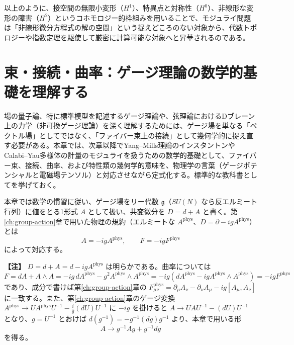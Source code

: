 \documentclass[uplatex, dvipdfmx, book]{jsbook}
\let\origsection\section
\let\origsubsection\subsection
\let\origsubsubsection\subsubsection
\newcommand{\chapter}{\origsection}
\renewcommand{\section}{\origsubsection}
\renewcommand{\subsection}{\origsubsubsection}
\renewcommand{\subsubsection}{\paragraph}
\newenvironment{note}{\vspace{1ex}\par\footnotesize\noindent\textbf{【注】}}{\par\vspace{1ex}}
\begin{document}
以上のように、接空間の無限小変形（$H^1$）、特異点と対称性（$H^0$）、非線形な変形の障害（$H^2$）というコホモロジー的枠組みを用いることで、モジュライ問題は「非線形微分方程式の解の空間」という捉えどころのない対象から、代数トポロジーや指数定理を駆使して厳密に計算可能な対象へと昇華されるのである。
\chapter{束・接続・曲率：ゲージ理論の数学的基礎を理解する}
\label{ch:bundle}

場の量子論、特に標準模型を記述するゲージ理論や、弦理論におけるDブレーン上の力学（非可換ゲージ理論）を深く理解するためには、ゲージ場を単なる「ベクトル場」としてではなく、「ファイバー束上の接続」として幾何学的に捉え直す必要がある。本章では、次章以降でYang--Mills理論のインスタントンやCalabi--Yau多様体の計量のモジュライを扱うための数学的基礎として、ファイバー束、接続、曲率、および特性類の幾何学的意味を、物理学の言葉（ゲージポテンシャルと電磁場テンソル）と対応させながら定式化する。標準的な教科書として\cite{nakahara2003}を挙げておく。

本章では数学の慣習に従い、ゲージ場をリー代数 $\mathfrak{g}$（$SU(N)$ なら反エルミート行列）に値をとる1形式 $A$ として扱い、共変微分を $D = d + A$ と書く。第\ref{ch:group-action}章で用いた物理の規約（エルミートな $A^{\text{phys}}$、$D = \partial - igA^{\text{phys}}$）とは
\begin{equation}
    A = -ig A^{\text{phys}}, \qquad F = -ig F^{\text{phys}}
    \label{eq:convention-ch4}
\end{equation}
によって対応する。

\begin{note}
$D = d + A = d - igA^{\text{phys}}$ は明らかである。曲率については
\begin{equation*}
    F = dA + A \wedge A = -ig\, dA^{\text{phys}} - g^2 A^{\text{phys}} \wedge A^{\text{phys}} = -ig\left( dA^{\text{phys}} - ig A^{\text{phys}} \wedge A^{\text{phys}} \right) = -ig F^{\text{phys}}
\end{equation*}
であり、成分で書けば第\ref{ch:group-action}章の $F^{\text{phys}}_{\mu\nu} = \partial_\mu A_\nu - \partial_\nu A_\mu - ig[A_\mu, A_\nu]$ に一致する。また、第\ref{ch:group-action}章のゲージ変換 $A^{\text{phys}} \to U A^{\text{phys}} U^{-1} - \frac{i}{g}(dU)U^{-1}$ に $-ig$ を掛けると $A \to UAU^{-1} - (dU)U^{-1}$ となり、$g = U^{-1}$ とおけば $d(g^{-1}) = -g^{-1}(dg)g^{-1}$ より、本章で用いる形
\begin{equation*}
    A \to g^{-1} A g + g^{-1} dg
\end{equation*}
を得る。
\end{note}
\end{document}
